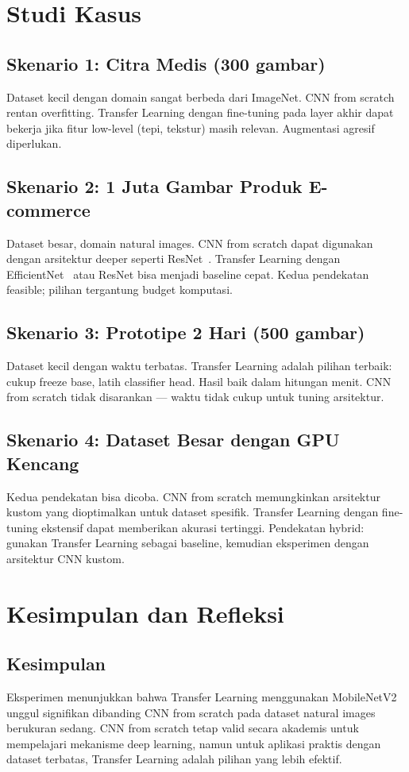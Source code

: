 \documentclass[conference]{IEEEtran}
\begin{document}
\section{Studi Kasus}
\subsection{Skenario 1: Citra Medis (300 gambar)}
Dataset kecil dengan domain sangat berbeda dari ImageNet. CNN from scratch rentan overfitting. Transfer Learning dengan fine-tuning pada layer akhir dapat bekerja jika fitur low-level (tepi, tekstur) masih relevan. Augmentasi agresif diperlukan.

\subsection{Skenario 2: 1 Juta Gambar Produk E-commerce}
Dataset besar, domain natural images. CNN from scratch dapat digunakan dengan arsitektur deeper seperti ResNet~\cite{he2016}. Transfer Learning dengan EfficientNet~\cite{tan2019} atau ResNet bisa menjadi baseline cepat. Kedua pendekatan feasible; pilihan tergantung budget komputasi.

\subsection{Skenario 3: Prototipe 2 Hari (500 gambar)}
Dataset kecil dengan waktu terbatas. Transfer Learning adalah pilihan terbaik: cukup freeze base, latih classifier head. Hasil baik dalam hitungan menit. CNN from scratch tidak disarankan — waktu tidak cukup untuk tuning arsitektur.

\subsection{Skenario 4: Dataset Besar dengan GPU Kencang}
Kedua pendekatan bisa dicoba. CNN from scratch memungkinkan arsitektur kustom yang dioptimalkan untuk dataset spesifik. Transfer Learning dengan fine-tuning ekstensif dapat memberikan akurasi tertinggi. Pendekatan hybrid: gunakan Transfer Learning sebagai baseline, kemudian eksperimen dengan arsitektur CNN kustom.

\section{Kesimpulan dan Refleksi}
\subsection{Kesimpulan}
Eksperimen menunjukkan bahwa Transfer Learning menggunakan MobileNetV2 unggul signifikan dibanding CNN from scratch pada dataset natural images berukuran sedang. CNN from scratch tetap valid secara akademis untuk mempelajari mekanisme deep learning, namun untuk aplikasi praktis dengan dataset terbatas, Transfer Learning adalah pilihan yang lebih efektif.
\end{document}
